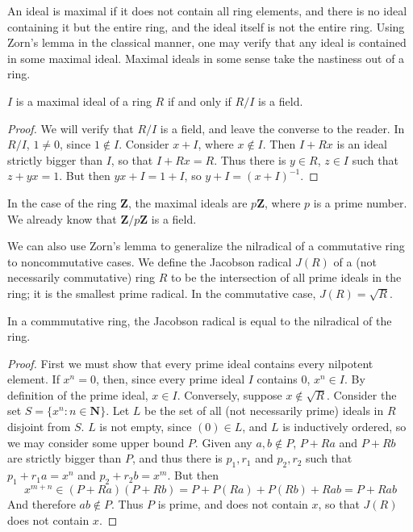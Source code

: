 An ideal is maximal if it does not contain all ring elements, and there is no ideal containing it but the entire ring, and the ideal itself is not the entire ring. Using Zorn's lemma in the classical manner, one may verify that any ideal is contained in some maximal ideal. Maximal ideals in some sense take the nastiness out of a ring.

\begin{theorem}
    $I$ is a maximal ideal of a ring $R$ if and only if $R/I$ is a field.
\end{theorem}
\begin{proof}
    We will verify that $R/I$ is a field, and leave the converse to the reader. In $R/I$, $1 \neq 0$, since $1 \not\in I$. Consider $x + I$, where $x \not\in I$. Then $I + Rx$ is an ideal strictly bigger than $I$, so that $I + Rx = R$. Thus there is $y \in R$, $z \in I$ such that $z + yx = 1$. But then $yx + I = 1 + I$, so $y + I = (x + I)^{-1}$.
\end{proof}

In the case of the ring $\mathbf{Z}$, the maximal ideals are $p\mathbf{Z}$, where $p$ is a prime number. We already know that $\mathbf{Z}/p\mathbf{Z}$ is a field.

We can also use Zorn's lemma to generalize the nilradical of a commutative ring to noncommutative cases. We define the Jacobson radical $J(R)$ of a (not necessarily commutative) ring $R$ to be the intersection of all prime ideals in the ring; it is the smallest prime radical. In the commutative case, $J(R) = \sqrt{R}$.

\begin{theorem}
    In a commmutative ring, the Jacobson radical is equal to the nilradical of the ring.
\end{theorem}
\begin{proof}
    First we must show that every prime ideal contains every nilpotent element. If $x^n = 0$, then, since every prime ideal $I$ contains $0$, $x^n \in I$. By definition of the prime ideal, $x \in I$. Conversely, suppose $x \not\in \sqrt{R}$. Consider the set $S = \{ x^n : n \in \mathbf{N} \}$. Let $L$ be the set of all (not necessarily prime) ideals in $R$ disjoint from $S$. $L$ is not empty, since $(0) \in L$, and $L$ is inductively ordered, so we may consider some upper bound $P$. Given any $a,b \not\in P$, $P + Ra$ and $P + Rb$ are strictly bigger than $P$, and thus there is $p_1,r_1$ and $p_2,r_2$ such that $p_1 + r_1a = x^n$ and $p_2 + r_2b = x^m$. But then
    \[ x^{m + n} \in (P + Ra)(P + Rb) = P + P(Ra) + P(Rb) + Rab = P + Rab \]
    And therefore $ab \notin P$. Thus $P$ is prime, and does not contain $x$, so that $J(R)$ does not contain $x$.
\end{proof}



